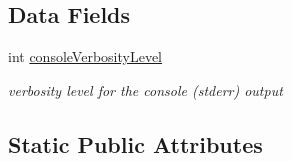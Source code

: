 \subsection*{Data Fields}
\begin{CompactItemize}
\item 
int \hyperlink{structEOSKernel_834ee3631c926c273cb99ab2a80e2a4c}{consoleVerbosityLevel}
\begin{CompactList}\small\item\em verbosity level for the console (stderr) output \item\end{CompactList}\end{CompactItemize}
\subsection*{Static Public Attributes}
